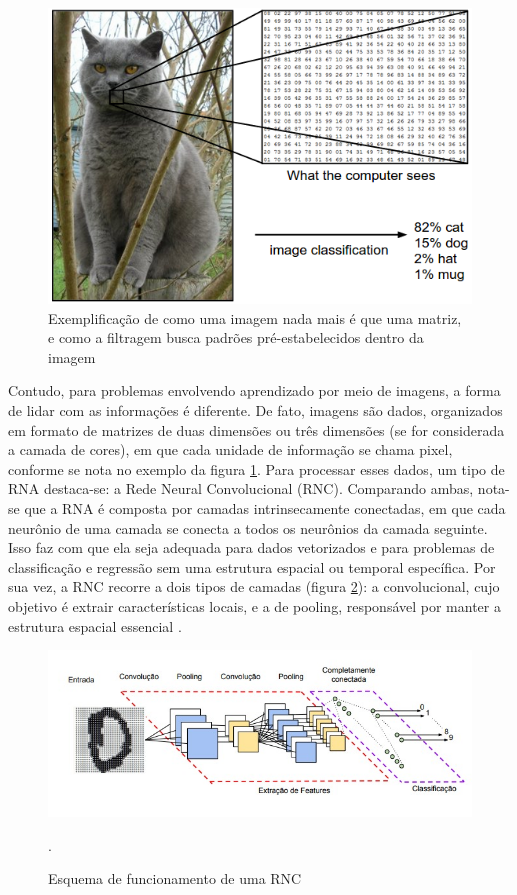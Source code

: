 \begin{figure}[!h]
    \center
    \begin{minipage}{0.9\linewidth}
    \center
    \captionsetup{justification=centering,margin=0.5cm,font=small}
    \includegraphics[width=0.7\linewidth]{img/cap2/gato.png}
    \caption{ Exemplificação de como uma imagem nada mais é que uma matriz, e como a filtragem busca padrões pré-estabelecidos dentro da imagem \cite{lima2020captcha}} 
    \label{fig:gato}
    \end{minipage}
\end{figure}

Contudo, para problemas envolvendo aprendizado por meio de imagens, a forma de lidar com as informações é diferente. De fato, imagens são dados, organizados em formato de matrizes de duas dimensões ou três dimensões (se for considerada a camada de cores), em que cada unidade de informação se chama pixel, conforme se nota no exemplo da figura \ref{fig:gato}. Para processar esses dados, um tipo de RNA destaca-se: a Rede Neural Convolucional (RNC). Comparando ambas, nota-se que a RNA é composta por camadas intrinsecamente conectadas, em que cada neurônio de uma camada se conecta a todos os neurônios da camada seguinte. Isso faz com que ela seja adequada para dados vetorizados e para problemas de classificação e regressão sem uma estrutura espacial ou temporal específica. Por sua vez, a RNC recorre a dois tipos de camadas (figura \ref{fig:rnc}): a convolucional, cujo objetivo é extrair características locais, e a de pooling, responsável por manter a estrutura espacial essencial \cite{vargas2016estudo}. 

\begin{figure}[!h]
    \centering
    \begin{minipage}{0.9\linewidth}
    \centering
    \captionsetup{justification=centering,margin=0.5cm,font=small}
    \includegraphics[width=0.7\linewidth]{img/cap2/cnn.jpeg}
    \caption{Esquema de funcionamento de uma RNC \cite{vargas2016estudo}}.
    \label{fig:rnc}
    \end{minipage}
\end{figure}

